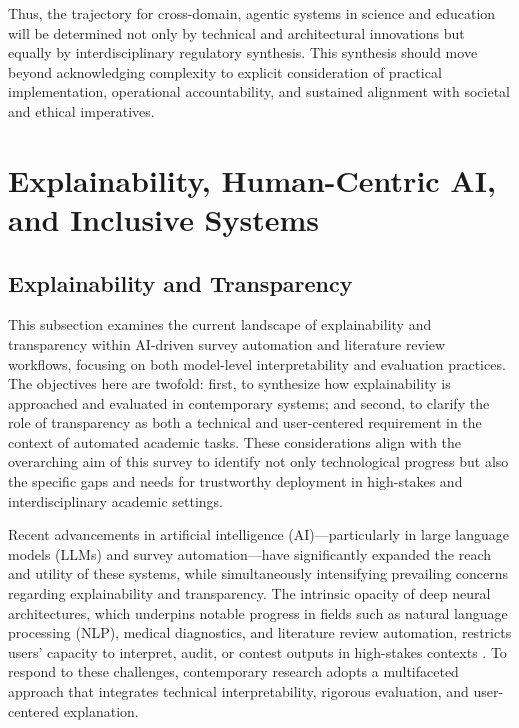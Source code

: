 \documentclass[sigconf]{acmart}
\begin{document}
Thus, the trajectory for cross-domain, agentic systems in science and education will be determined not only by technical and architectural innovations but equally by interdisciplinary regulatory synthesis. This synthesis should move beyond acknowledging complexity to explicit consideration of practical implementation, operational accountability, and sustained alignment with societal and ethical imperatives.

\section{Explainability, Human-Centric AI, and Inclusive Systems}

\subsection{Explainability and Transparency}

This subsection examines the current landscape of explainability and transparency within AI-driven survey automation and literature review workflows, focusing on both model-level interpretability and evaluation practices. The objectives here are twofold: first, to synthesize how explainability is approached and evaluated in contemporary systems; and second, to clarify the role of transparency as both a technical and user-centered requirement in the context of automated academic tasks. These considerations align with the overarching aim of this survey to identify not only technological progress but also the specific gaps and needs for trustworthy deployment in high-stakes and interdisciplinary academic settings.

Recent advancements in artificial intelligence (AI)—particularly in large language models (LLMs) and survey automation—have significantly expanded the reach and utility of these systems, while simultaneously intensifying prevailing concerns regarding explainability and transparency. The intrinsic opacity of deep neural architectures, which underpins notable progress in fields such as natural language processing (NLP), medical diagnostics, and literature review automation, restricts users’ capacity to interpret, audit, or contest outputs in high-stakes contexts \cite{ref36,ref38,ref39,ref46,ref47,ref62,ref63,ref64,ref65,ref68,ref76,ref80,ref82,ref83,ref102,ref103,ref106}. To respond to these challenges, contemporary research adopts a multifaceted approach that integrates technical interpretability, rigorous evaluation, and user-centered explanation.
\end{document}
